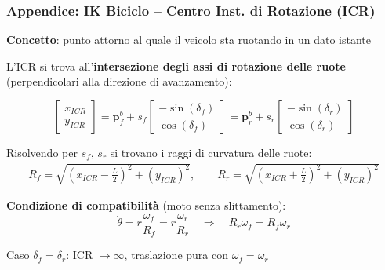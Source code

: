 \begin{frame}
    \frametitle{Appendice: IK Biciclo -- Centro Inst. di Rotazione (ICR)}
    \textbf{Concetto}: punto attorno al quale il veicolo sta ruotando in un dato istante

    \vspace{0.3cm}

    L'ICR si trova all'\textbf{intersezione degli assi di rotazione delle ruote} (perpendicolari alla direzione di avanzamento):

    \begin{equation}
        \begin{bmatrix}
            x_{ICR} \\ y_{ICR}
        \end{bmatrix}
        = \mathbf{p}_f^b + s_f \begin{bmatrix}
            -\sin(\delta_f) \\ \cos(\delta_f)
        \end{bmatrix}= \mathbf{p}_r^b + s_r \begin{bmatrix}
            -\sin(\delta_r) \\ \cos(\delta_r)
        \end{bmatrix}
    \end{equation}

    Risolvendo per $s_f$, $s_r$ si trovano i raggi di curvatura delle ruote:
    \begin{align}
        R_f = \sqrt{\left(x_{ICR} - \frac{L}{2}\right)^2 + \left(y_{ICR} \right)^2}, \qquad
        R_r = \sqrt{\left(x_{ICR} + \frac{L}{2}\right)^2 + \left(y_{ICR} \right)^2}
    \end{align}

    \textbf{Condizione di compatibilità} (moto senza slittamento):
    \begin{equation}
        \dot{\theta}= r\frac{\omega_f}{R_f}=r\frac{\omega_r}{R_r} \quad \Rightarrow \quad R_r \omega_f = R_f \omega_r
    \end{equation}

    \small{Caso $\delta_f= \delta_r$: ICR $\to \infty$, traslazione pura con $\omega_f = \omega_r$}
\end{frame}

